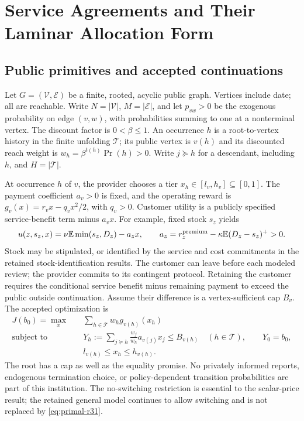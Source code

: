 \section{Service Agreements and Their Laminar Allocation Form}\label{sec:model}
\subsection{Public primitives and accepted continuations}
Let $G=(\mathcal V,\mathcal E)$ be a finite, rooted, acyclic public graph. Vertices include date; all are reachable. Write $N=|\mathcal V|$, $M=|\mathcal E|$, and let $p_{vw}>0$ be the exogenous probability on edge $(v,w)$, with probabilities summing to one at a nonterminal vertex. The discount factor is $0<\beta\leq1$. An occurrence $h$ is a root-to-vertex history in the finite unfolding $\mathcal T$; its public vertex is $v(h)$ and its discounted reach weight is $w_h=\beta^{t(h)}\Pr(h)>0$. Write $j\succeq h$ for a descendant, including $h$, and $H=|\mathcal T|$.

At occurrence $h$ of $v$, the provider chooses a tier $x_h\in[l_v,h_v]\subseteq[0,1]$. The payment coefficient $a_v>0$ is fixed, and the operating reward is $g_v(x)=r_vx-q_vx^2/2$, with $q_v>0$. Customer utility is a publicly specified service-benefit term minus $a_vx$. For example, fixed stock $s_z$ yields
\begin{equation}\label{eq:customer-r31}
 u(z,s_z,x)=\nu\mathbb E\min(s_z,D_z)-a_zx,
 \qquad a_z=r_z^{\rm premium}-\kappa\mathbb E(D_z-s_z)^+>0.
\end{equation}
Stock may be stipulated, or identified by the service and cost commitments in the retained stock-identification results. The customer can leave before each modeled review; the provider commits to its contingent protocol. Retaining the customer requires the conditional service benefit minus remaining payment to exceed the public outside continuation. Assume their difference is a vertex-sufficient cap $B_v$. The accepted optimization is
\begin{align}
 J(b_0)=\max_x\quad &\sum_{h\in\mathcal T}w_hg_{v(h)}(x_h) \label{eq:primal-r31}\\
 \text{subject to}\quad
 &Y_h:=\sum_{j\succeq h}\frac{w_j}{w_h}a_{v(j)}x_j\leq B_{v(h)}\quad(h\in\mathcal T),\qquad Y_0=b_0,\nonumber\\
 &l_{v(h)}\leq x_h\leq h_{v(h)}.\nonumber
\end{align}
The root has a cap as well as the equality promise. No privately informed reports, endogenous termination choice, or policy-dependent transition probabilities are part of this institution. The no-switching restriction is essential to the scalar-price result; the retained general model continues to allow switching and is not replaced by \eqref{eq:primal-r31}.

